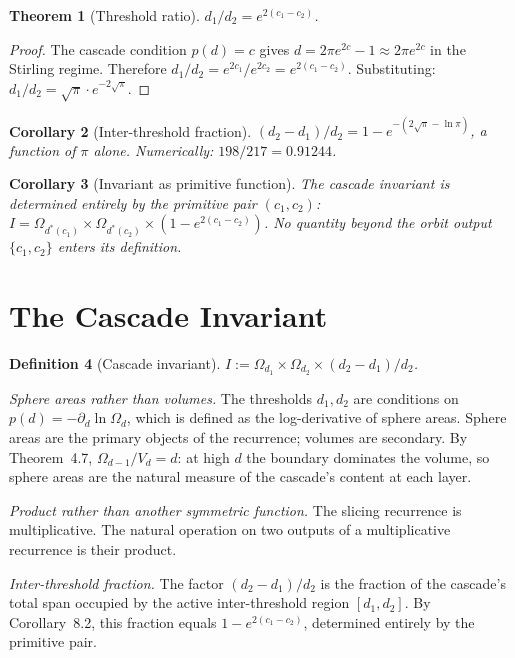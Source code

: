 \documentclass[11pt,a4paper]{article}
\newtheorem{theorem}{Theorem}[section]
\newtheorem{corollary}[theorem]{Corollary}
\newtheorem{definition}[theorem]{Definition}
\begin{document}
\begin{theorem}[Threshold ratio]
$d_1/d_2 = e^{2(c_1-c_2)}$.
\end{theorem}

\begin{proof}
The cascade condition $p(d) = c$ gives $d = 2\pi e^{2c}-1\approx 2\pi e^{2c}$ in the Stirling regime. Therefore $d_1/d_2 = e^{2c_1}/e^{2c_2} = e^{2(c_1-c_2)}$. Substituting: $d_1/d_2 = \sqrt{\pi}\cdot e^{-2\sqrt{\pi}}$.
\end{proof}

\begin{corollary}[Inter-threshold fraction]
$(d_2-d_1)/d_2 = 1 - e^{-(2\sqrt{\pi}-\ln\pi)}$, a function of $\pi$ alone. Numerically: $198/217 = 0.91244$.
\end{corollary}

\begin{corollary}[Invariant as primitive function]
The cascade invariant is determined entirely by the primitive pair $(c_1, c_2)$: $I = \Omega_{d^*(c_1)}\times\Omega_{d^*(c_2)}\times(1-e^{2(c_1-c_2)})$. No quantity beyond the orbit output $\{c_1, c_2\}$ enters its definition.
\end{corollary}

\section{The Cascade Invariant}

\begin{definition}[Cascade invariant]
$I := \Omega_{d_1}\times\Omega_{d_2}\times(d_2-d_1)/d_2$.
\end{definition}

\textit{Sphere areas rather than volumes.} The thresholds $d_1, d_2$ are conditions on $p(d) = -\partial_d\ln\Omega_d$, which is defined as the log-derivative of sphere areas. Sphere areas are the primary objects of the recurrence; volumes are secondary. By Theorem~4.7, $\Omega_{d-1}/V_d = d$: at high $d$ the boundary dominates the volume, so sphere areas are the natural measure of the cascade's content at each layer.

\textit{Product rather than another symmetric function.} The slicing recurrence is multiplicative. The natural operation on two outputs of a multiplicative recurrence is their product.

\textit{Inter-threshold fraction.} The factor $(d_2-d_1)/d_2$ is the fraction of the cascade's total span occupied by the active inter-threshold region $[d_1, d_2]$. By Corollary~8.2, this fraction equals $1-e^{2(c_1-c_2)}$, determined entirely by the primitive pair.
\end{document}
